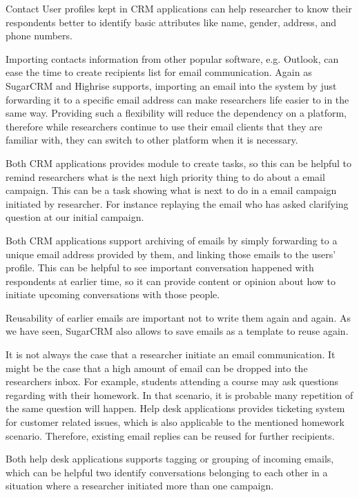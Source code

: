 \begin{compactitem}
	\item Contact User profiles kept in \ac{CRM} applications can help researcher to know their respondents better to identify basic attributes like name, gender, address, and phone numbers.
	\item Importing contacts information from other popular software, e.g. Outlook, can ease the time to create recipients list for email communication. Again as SugarCRM and Highrise supports, importing an email into the system by just forwarding it to a specific email address can make researchers life easier to in the same way. Providing such a flexibility will reduce the dependency on a platform, therefore while researchers continue to use their email clients that they are familiar with, they can switch to other platform when it is necessary.
	\item Both \ac{CRM} applications provides module to create tasks, so this can be helpful to remind researchers what is the next high priority thing to do about a email campaign. This can be a task showing what is next to do in a email campaign initiated by researcher. For instance replaying the email who has asked clarifying question at our initial campaign.
	\item Both \ac{CRM} applications support archiving of emails by simply forwarding to a unique email address provided by them, and linking those emails to the users' profile. This can be helpful to see important conversation happened with respondents at earlier time, so it can provide content or opinion about how to initiate upcoming conversations with those people.
	\item Reusability of earlier emails are important not to write them again and again. As we have seen, SugarCRM also allows to save emails as a template to reuse again.
	\item It is not always the case that a researcher initiate an email communication. It might be the case that a high amount of email can be dropped into the researchers inbox. For example, students attending a course may ask questions regarding with their homework. In that scenario, it is probable many repetition of the same question will happen. Help desk applications provides ticketing system for customer related issues, which is also applicable to the mentioned homework scenario. Therefore, existing email replies can be reused for further recipients.
	\item Both help desk applications supports tagging or grouping of incoming emails, which can be helpful two identify conversations belonging to each other in a situation where a researcher initiated more than one campaign.

\end{compactitem}

